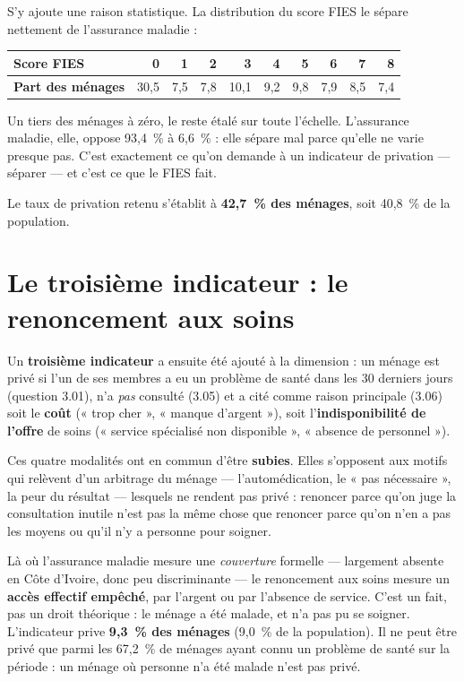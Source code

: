 \documentclass[11pt,a4paper]{article}
\begin{document}
S'y ajoute une raison statistique. La distribution du score FIES le sépare nettement de
l'assurance maladie :

\begin{center}
\small
\begin{tabular}{@{}lrrrrrrrrr@{}}
\toprule
\textbf{Score FIES} & 0 & 1 & 2 & 3 & 4 & 5 & 6 & 7 & 8 \\
\midrule
\textbf{Part des ménages} & 30,5 & 7,5 & 7,8 & 10,1 & 9,2 & 9,8 & 7,9 & 8,5 & 7,4 \\
\bottomrule
\end{tabular}
\end{center}

Un tiers des ménages à zéro, le reste étalé sur toute l'échelle. L'assurance maladie, elle, oppose
93,4~\% à 6,6~\% : elle sépare mal parce qu'elle ne varie presque pas. C'est exactement ce qu'on
demande à un indicateur de privation --- séparer --- et c'est ce que le FIES fait.

Le taux de privation retenu s'établit à \textbf{42,7~\% des ménages}, soit 40,8~\% de la
population.

\section{Le troisième indicateur : le renoncement aux soins}

Un \textbf{troisième indicateur} a ensuite été ajouté à la dimension : un ménage est privé si l'un
de ses membres a eu un problème de santé dans les 30 derniers jours (question 3.01), n'a
\emph{pas} consulté (3.05) et a cité comme raison principale (3.06) soit le \textbf{coût}
(« trop cher », « manque d'argent »), soit l'\textbf{indisponibilité de l'offre} de soins
(« service spécialisé non disponible », « absence de personnel »).

Ces quatre modalités ont en commun d'être \textbf{subies}. Elles s'opposent aux motifs qui
relèvent d'un arbitrage du ménage --- l'automédication, le « pas nécessaire », la peur du
résultat --- lesquels ne rendent pas privé : renoncer parce qu'on juge la consultation inutile
n'est pas la même chose que renoncer parce qu'on n'en a pas les moyens ou qu'il n'y a personne
pour soigner.

Là où l'assurance maladie mesure une \emph{couverture} formelle --- largement absente en Côte
d'Ivoire, donc peu discriminante --- le renoncement aux soins mesure un \textbf{accès effectif
empêché}, par l'argent ou par l'absence de service. C'est un fait, pas un droit théorique : le
ménage a été malade, et n'a pas pu se soigner. L'indicateur prive \textbf{9,3~\% des ménages}
(9,0~\% de la population). Il ne peut être privé que parmi les 67,2~\% de ménages ayant connu un
problème de santé sur la période : un ménage où personne n'a été malade n'est pas privé.
\end{document}
